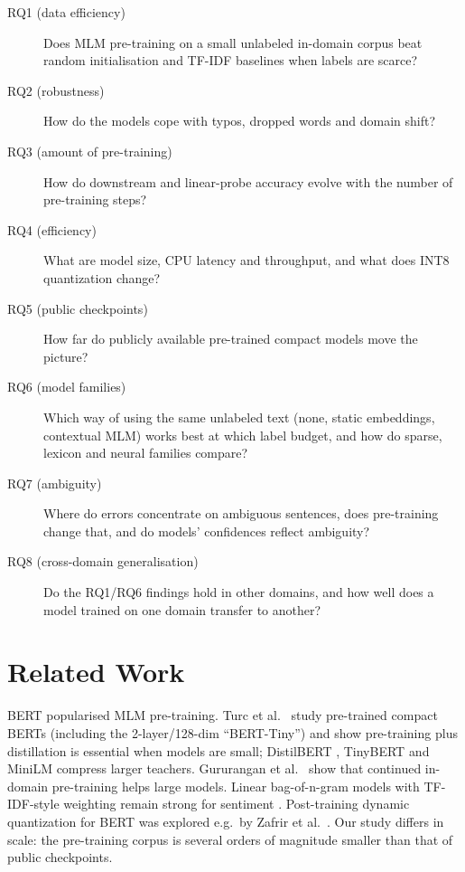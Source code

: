 \documentclass[11pt,a4paper]{article}
\begin{document}
\begin{description}
\item[RQ1 (data efficiency)] Does MLM pre-training on a small unlabeled in-domain corpus beat random initialisation and TF-IDF baselines when labels are scarce?
\item[RQ2 (robustness)] How do the models cope with typos, dropped words and domain shift?
\item[RQ3 (amount of pre-training)] How do downstream and linear-probe accuracy evolve with the number of pre-training steps?
\item[RQ4 (efficiency)] What are model size, CPU latency and throughput, and what does INT8 quantization change?
\item[RQ5 (public checkpoints)] How far do publicly available pre-trained compact models move the picture?
\item[RQ6 (model families)] Which way of using the same unlabeled text (none, static embeddings, contextual MLM) works best at which label budget, and how do sparse, lexicon and neural families compare?
\item[RQ7 (ambiguity)] Where do errors concentrate on ambiguous sentences, does pre-training change that, and do models' confidences reflect ambiguity?
\item[RQ8 (cross-domain generalisation)] Do the RQ1/RQ6 findings hold in other domains, and how well does a model trained on one domain transfer to another?
\end{description}

\section{Related Work}
BERT \cite{devlin2019bert} popularised MLM pre-training. Turc et al.\ \cite{turc2019well} study pre-trained compact
BERTs (including the 2-layer/128-dim ``BERT-Tiny'') and show pre-training plus distillation is essential when models are
small; DistilBERT \cite{sanh2019distilbert}, TinyBERT \cite{jiao2020tinybert} and MiniLM \cite{wang2020minilm} compress larger
teachers. Gururangan et al.\ \cite{gururangan2020dont} show that continued in-domain pre-training helps
large models. Linear bag-of-n-gram models with TF-IDF-style weighting remain strong for sentiment \cite{wang2012baselines}.
Post-training dynamic quantization for BERT was explored e.g.\ by Zafrir et al.\ \cite{zafrir2019q8bert}. Our study
differs in scale: the pre-training corpus is several orders of magnitude smaller than that of public checkpoints.
\end{document}
